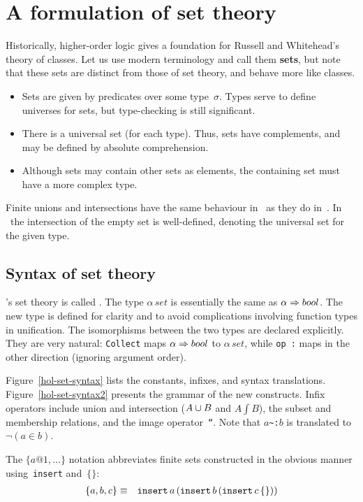 \section{A formulation of set theory}
Historically, higher-order logic gives a foundation for Russell and
Whitehead's theory of classes.  Let us use modern terminology and call them
{\bf sets}, but note that these sets are distinct from those of {\ZF} set
theory, and behave more like {\ZF} classes.
\begin{itemize}
\item
Sets are given by predicates over some type~$\sigma$.  Types serve to
define universes for sets, but type-checking is still significant.
\item
There is a universal set (for each type).  Thus, sets have complements, and
may be defined by absolute comprehension.
\item
Although sets may contain other sets as elements, the containing set must
have a more complex type.
\end{itemize}
Finite unions and intersections have the same behaviour in \HOL\ as they
do in~{\ZF}.  In \HOL\ the intersection of the empty set is well-defined,
denoting the universal set for the given type.

\subsection{Syntax of set theory}
\HOL's set theory is called .  The type $\alpha\,set$ is
essentially the same as $\alpha\Rightarrow bool$.  The new type is defined for
clarity and to avoid complications involving function types in unification.
The isomorphisms between the two types are declared explicitly.  They are
very natural: \texttt{Collect} maps $\alpha\Rightarrow bool$ to $\alpha\,set$, while
\hbox{\tt op :} maps in the other direction (ignoring argument order).

Figure~\ref{hol-set-syntax} lists the constants, infixes, and syntax
translations.  Figure~\ref{hol-set-syntax2} presents the grammar of the new
constructs.  Infix operators include union and intersection ($A\cup B$
and $A\int B$), the subset and membership relations, and the image
operator~{\tt``}\@.  Note that $a$\verb|~:|$b$ is translated to
$\lnot(a\in b)$.  

The $\{a@1,\ldots\}$ notation abbreviates finite sets constructed in
the obvious manner using~\texttt{insert} and~$\{\}$:
\begin{eqnarray*}
  \{a, b, c\} & \equiv &
  \texttt{insert} \, a \, ({\tt insert} \, b \, ({\tt insert} \, c \, \{\}))
\end{eqnarray*}

